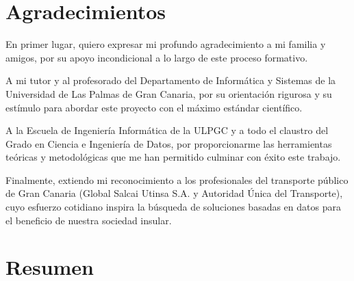 \documentclass[11pt,a4paper,twoside]{report}
\begin{document}
\chapter*{Agradecimientos}

En primer lugar, quiero expresar mi profundo agradecimiento a mi familia y amigos, por su apoyo incondicional a lo largo de este proceso formativo. 

A mi tutor y al profesorado del Departamento de Informática y Sistemas de la Universidad de Las Palmas de Gran Canaria, por su orientación rigurosa y su estímulo para abordar este proyecto con el máximo estándar científico.

A la Escuela de Ingeniería Informática de la ULPGC y a todo el claustro del Grado en Ciencia e Ingeniería de Datos, por proporcionarme las herramientas teóricas y metodológicas que me han permitido culminar con éxito este trabajo.

Finalmente, extiendo mi reconocimiento a los profesionales del transporte público de Gran Canaria (Global Salcai Utinsa S.A. y Autoridad Única del Transporte), cuyo esfuerzo cotidiano inspira la búsqueda de soluciones basadas en datos para el beneficio de nuestra sociedad insular.

\chapter*{Resumen}
\end{document}
